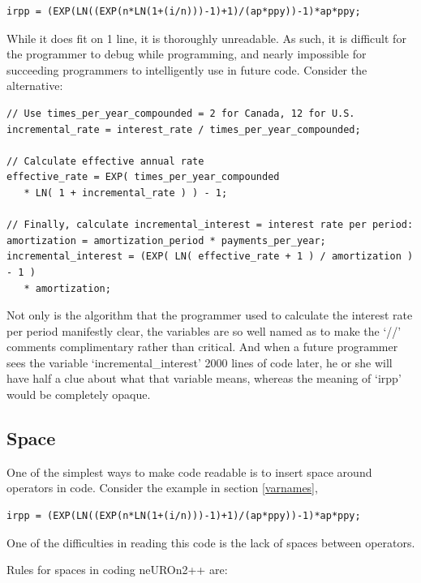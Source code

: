 \documentclass{report}
\begin{document}
\begin{verbatim}
irpp = (EXP(LN((EXP(n*LN(1+(i/n)))-1)+1)/(ap*ppy))-1)*ap*ppy;
\end{verbatim}

While it does fit on 1 line, it is thoroughly unreadable.  As such, it
is difficult for the programmer to debug while programming, and nearly
impossible for succeeding programmers to intelligently use in future
code.  Consider the alternative:

\begin{verbatim}
// Use times_per_year_compounded = 2 for Canada, 12 for U.S.
incremental_rate = interest_rate / times_per_year_compounded;

// Calculate effective annual rate
effective_rate = EXP( times_per_year_compounded
   * LN( 1 + incremental_rate ) ) - 1;

// Finally, calculate incremental_interest = interest rate per period:
amortization = amortization_period * payments_per_year;
incremental_interest = (EXP( LN( effective_rate + 1 ) / amortization )
- 1 )
   * amortization;
\end{verbatim}

Not only is the algorithm that the programmer used to calculate the
interest rate per period manifestly clear, the variables are so well
named as to make the `//' comments complimentary rather than critical.
And when a future programmer sees the variable `incremental\_interest'
2000 lines of code later, he or she will have half a clue about what
that variable means, whereas the meaning of `irpp' would be completely
opaque.

\subsection{Space}

One of the simplest ways to make code readable is to insert space
around operators in code.  Consider the example in section
\ref{varnames},

\begin{verbatim}
irpp = (EXP(LN((EXP(n*LN(1+(i/n)))-1)+1)/(ap*ppy))-1)*ap*ppy;
\end{verbatim}

One of the difficulties in reading this code is the lack of spaces
between operators.

Rules for spaces in coding neUROn2++ are:
\end{document}
